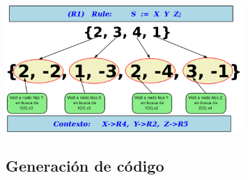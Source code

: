 \documentclass[10pt, xcolor=table, xcolor=dvipsnames]{beamer}
\begin{document}
% 
% 
% 

\begin{frame}

     \begin{center}
\includegraphics[width=340px, height=182px]{./plan2seq.png}
    \end{center}

\end{frame}


\subsection{Generación de código}
\end{document}

